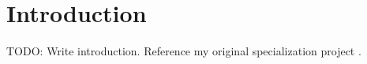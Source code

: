 \chapter{Introduction}

TODO: Write introduction.
Reference my original specialization project \cite{specialization-project}.
